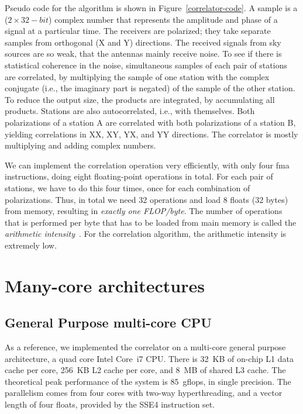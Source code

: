 \documentclass{article}
\begin{document}
Pseudo code for the algorithm is shown in Figure~\ref{correlator-code}.
A sample is a ($2 \times 32-bit$) complex number that represents the
amplitude and phase of a signal at a particular time. The receivers
are polarized; they take separate samples from orthogonal (X and Y)
directions. The received signals from sky sources are so weak, that the antennas 
mainly receive noise. To see if there is statistical coherence
in the noise, simultaneous samples of each pair of stations are correlated, 
by multiplying the sample of one station with the complex
conjugate (i.e., the imaginary part is negated) of the sample of the other station.
To reduce the output size, the products are integrated, by accumulating all products. 
Stations are also autocorrelated, i.e., with
themselves. Both polarizations of a station A are correlated with both polarizations 
of a station B, yielding correlations in XX, XY, YX, and YY
directions.
The correlator is mostly multiplying and adding complex numbers.

We can implement the correlation operation very efficiently, with only
four fma instructions, doing eight floating-point operations in
total. For each pair of stations, we have to do this four times, once
for each combination of polarizations. Thus, in total we need 32
operations and load 8 floats (32 bytes) from memory, resulting in \emph{exactly
  one FLOP/byte}.  The number of operations that is performed per byte
that has to be loaded from main memory is called the \emph{arithmetic
  intensity}~\cite{system-performance}. For the correlation algorithm,
the arithmetic intensity is extremely low.



\section{Many-core architectures}

\subsection{General Purpose multi-core CPU}

As a reference, we implemented the correlator on a multi-core general
purpose architecture, a quad core Intel Core~i7 CPU.  There is 32~KB
of on-chip L1 data cache per core, 256~KB L2 cache per core, and 8~MB
of shared L3 cache.  The theoretical peak performance of the system is
85~gflops, in single precision.  The parallelism comes from four cores
with two-way hyperthreading, and a vector length of four floats,
provided by the SSE4 instruction set.
\end{document}
